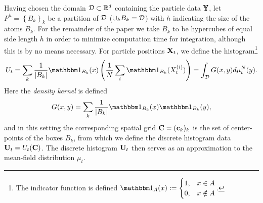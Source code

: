 \documentclass[english,reqno]{amsart}
\begin{document}
Having chosen the domain ${\mathcal{D}}\subset \mathbb{R}^d$ containing the particle data $\pmb{\mathbb{Y}}$, let $P^h = \left\{ B_k\right\}_k$ be a partition of ${\mathcal{D}}$ ($\cup_k B_k = {\mathcal{D}}$) with $h$ indicating the size of the atoms $B_k$. For the remainder of the paper we take $B_k$ to be hypercubes of equal side length $h$ in order to minimize computation time for integration, although this is by no means necessary. For particle positions $\mathbf{X}_t$, we define the histogram\footnote{The indicator function is defined $\ind{A}(x):=\begin{cases} 1, & x\in A\\0, & x\notin A\end{cases}$.}
\begin{equation}\label{histU}
U_t = \sum_k \frac{1}{|B_k|}\ind{B_k}(x) \left(\frac{1}{N}\sum_i \ind{B_k}(X^{(i)}_t)\right) = \int_\CalD G(x,y)d\mu^N_t(y).
\end{equation}
Here the {\it density kernel} is defined 
\[G(x,y) = \sum_k \frac{1}{|B_k|}\ind{B_k}(x)\ind{B_k}(y),\]
and in this setting the corresponding spatial grid $\mathbf{C} = (\mathbf{c}_k)_k$ is the set of center-points of the boxes $B_k$, from which we define the discrete histogram data $\mathbf{U}_t = U_t(\mathbf{C})$. The discrete histogram $\mathbf{U}_t$ then serves as an approximation to the mean-field distribution $\mu_t$.\\
\end{document}
